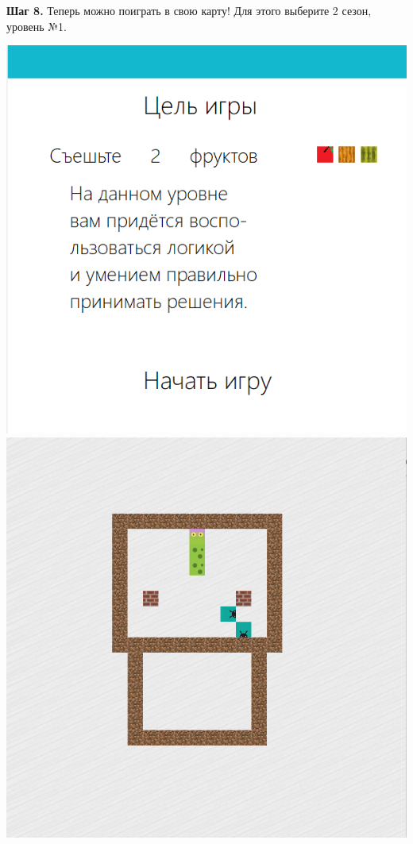 \documentclass[a4paper,14pt]{extarticle}
\begin{document}
\textbf{Шаг 8.} Теперь можно поиграть в свою карту! Для этого выберите 2 сезон, уровень №1. 
\begin{center}
\includegraphics[scale=.9]{img19}
\includegraphics[scale=.9]{img20}
\end{center}
\end{document}
